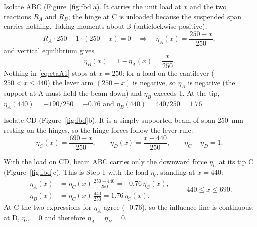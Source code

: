 \documentclass[11pt,a4paper]{article}
\newcommand{\il}[1]{\eta_{#1}}
\begin{document}
\begin{stepbox}
Isolate ABC (Figure~\ref{fig:fbd}a). It carries the unit load at $x$ and the two reactions $R_A$ and $R_B$; the hinge at C is unloaded because the suspended span carries nothing. Taking moments about B (anticlockwise positive),
\begin{equation}
  R_A \cdot 250 - 1\cdot(250 - x) = 0 \quad\Longrightarrow\quad
  \il{A}(x) = \frac{250 - x}{250},
  \label{eq:etaA1}
\end{equation}
and vertical equilibrium gives
\begin{equation}
  \il{B}(x) = 1 - \il{A}(x) = \frac{x}{250}.
  \label{eq:etaB1}
\end{equation}
Nothing in \eqref{eq:etaA1} stops at $x = 250$: for a load on the cantilever ($250 < x \le 440$) the lever arm $(250 - x)$ is negative, so $\il{A}$ is negative (the support at A must hold the beam down) and $\il{B}$ exceeds 1. At the tip, $\il{A}(440) = -190/250 = -0.76$ and $\il{B}(440) = 440/250 = 1.76$.
\end{stepbox}

\begin{stepbox}
Isolate CD (Figure~\ref{fig:fbd}b). It is a simply supported beam of span \SI{250}{mm} resting on the hinges, so the hinge forces follow the lever rule:
\begin{equation}
  \il{C}(x) = \frac{690 - x}{250}, \qquad \il{D}(x) = \frac{x - 440}{250}, \qquad \il{C} + \il{D} = 1.
  \label{eq:etaCD}
\end{equation}
\end{stepbox}

\begin{stepbox}
With the load on CD, beam ABC carries only the downward force $\il{C}$ at its tip C (Figure~\ref{fig:fbd}c). This is Step 1 with the load $\il{C}$ standing at $x = 440$:
\begin{equation}
  \begin{aligned}
  \il{A}(x) &= \il{C}(x)\,\frac{250 - 440}{250} = -0.76\,\il{C}(x),\\
  \il{B}(x) &= \il{C}(x)\,\frac{440}{250} = 1.76\,\il{C}(x),
  \end{aligned}
  \qquad 440 \le x \le 690.
  \label{eq:etaA2}
\end{equation}
At C the two expressions for $\il{A}$ agree ($-0.76$), so the influence line is continuous; at D, $\il{C} = 0$ and therefore $\il{A} = \il{B} = 0$.
\end{stepbox}
\end{document}
